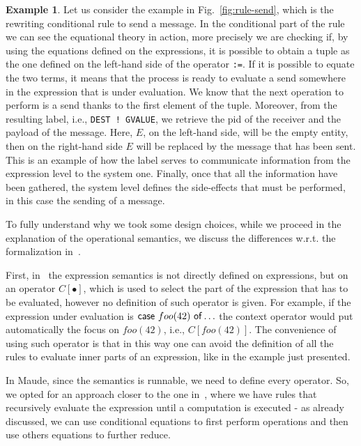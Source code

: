 \documentclass{article}[12pt,a4paper]
\theoremstyle{definition}
\newtheorem{example}{Example}[section]
\begin{document}
\begin{example}\label{ex:send}
  Let us consider the example in Fig.~\ref{fig:rule-send}, which is the
  rewriting conditional rule to send a message. In the conditional part of the
  rule we can see the equational theory in action, more precisely we are
  checking if, by using the equations defined on the expressions, it is possible
  to obtain a tuple as the one defined on the left-hand side of the operator
  \verb+:=+. If it is possible to equate the two terms, it means that the
  process is ready to evaluate a send somewhere in the expression that is under
  evaluation. We know that the next operation to perform is a send thanks to the
  first element of the tuple. Moreover, from the resulting label, i.e.,
  \verb_DEST ! GVALUE_, we retrieve the pid of the receiver and the payload of
  the message. Here, $E$, on the left-hand side, will be the empty entity, then
  on the right-hand side $E$ will be replaced by the message that has been sent.
  This is an example of how the label serves to communicate information from the
  expression level to the system one. Finally, once that all the information
  have been gathered, the system level defines the side-effects that must be
  performed, in this case the sending of a message.
\end{example}



To fully understand why we took some design choices, while we proceed in the
explanation of the operational semantics, we discuss the differences w.r.t. the
formalization in~\cite{Gonzalez-AbrilV21}.

First, in~\cite{Gonzalez-AbrilV21} the expression semantics is not directly
defined on expressions, but on an
operator $C[\bullet]$, which is used to select the part of the expression that has to be
evaluated, however no definition of such operator is given. For example, if the expression under evaluation is
$\mathsf{case}~foo(42)~\mathsf{of}\ldots$ the context operator would put automatically
the focus on $foo(42)$, i.e., $C[foo(42)]$. The convenience of using such
operator is that in this way one can avoid the definition of all the rules to
evaluate inner parts of an expression, like in the example just presented.

In Maude, since the semantics is
runnable, we need to define every operator. So, we opted for an approach closer
to the one in~\cite{LaneseNPV18}, where we have rules that recursively evaluate
the expression until a computation is executed - as already discussed, we can use
conditional equations to first perform operations and then use others equations
to further reduce.
\end{document}
